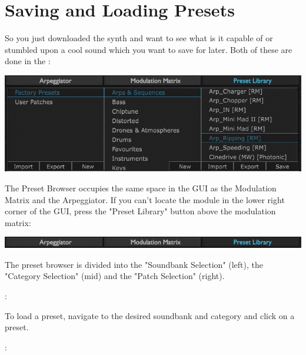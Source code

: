 \section{Saving and Loading Presets}
\label{presets}

So you just downloaded the synth and want to see what is it capable of or stumbled upon a cool sound which you want to save for later. Both of these are done in the :

\begin{center}
    \includegraphics[width=\textwidth]{graphics/preset_browser.png}
\end{center}

\begin{tcolorbox}[colback=yellow!10!white,
    colframe=white!20!black,
    center,
    valign=top,
    halign=left,
    center title,
    width=\textwidth]

    The Preset Browser occupies the same space in the GUI as the Modulation Matrix and the Arpeggiator. If you can't locate the module in the lower right corner of the GUI, press the "Preset Library" button above the modulation matrix:

    \begin{center}
        \includegraphics[width=\textwidth]{graphics/preset_browser_button.png}
    \end{center}
\end{tcolorbox}

The preset browser is divided into the "Soundbank Selection" (left), the "Category Selection" (mid) and the "Patch Selection" (right).

\vspace{5mm}
:

To load a preset, navigate to the desired soundbank and category and click on a preset.

\vspace{5mm}
:

